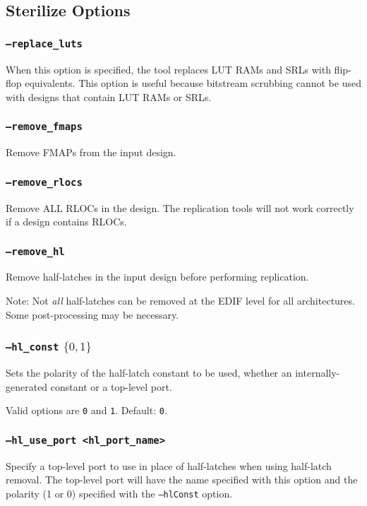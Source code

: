 \subsection{Sterilize Options}

\subsubsection{\texttt{--replace\_luts}}
When this option is specified, the tool replaces LUT RAMs and SRLs
with flip-flop equivalents. This option is useful because bitstream
scrubbing cannot be used with designs that contain LUT RAMs or SRLs.

\subsubsection{\texttt{--remove\_fmaps}}
Remove FMAPs from the input design.

\subsubsection{\texttt{--remove\_rlocs}}
Remove ALL RLOCs in the design.  The replication tools will not work
correctly if a design contains RLOCs.

\subsubsection{\texttt{--remove\_hl}}
Remove half-latches in the input design before performing replication.

Note: Not \emph{all} half-latches can be removed at the EDIF 
level for all architectures. Some post-processing may be necessary.

\subsubsection{\texttt{--hl\_const} $\{0,1\}$}
Sets the polarity of the half-latch constant to be used, whether an 
internally-generated constant or a top-level port. 

Valid options are \texttt{0} and \texttt{1}. Default: \texttt{0}.

\subsubsection{\texttt{--hl\_use\_port <hl\_port\_name>}}
Specify a top-level port to use in place of half-latches when 
using half-latch removal. The top-level port will have the name specified with 
this option and the polarity (1 or 0) specified with the \texttt{--hlConst} 
option.

